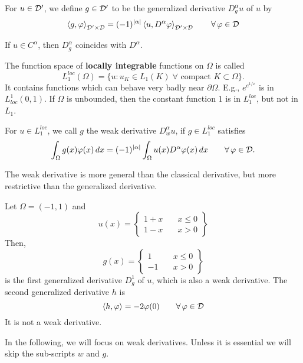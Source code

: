 \begin{definition} For $u \in {\cal D}^\prime$, we define 
$g \in {\cal D}^\prime$ to be the generalized 
derivative $D_g^\alpha u$ of $u$ by
$$
\left<g, \varphi \right>_{{\cal D}^\prime \times {\cal D}} = 
(-1)^{|\alpha|} \left<u, D^\alpha \varphi \right>_{{\cal D}^\prime \times {\cal D}}  \qquad \forall \, \varphi \in {\cal D}
$$
\end{definition}
%
\noindent
If $u \in C^\alpha$, then $D_g^\alpha$ coincides with $D^\alpha$. 

\noindent
The function space of {\bf locally integrable} functions on $\Omega$ 
is called
$$
L_1^{loc} (\Omega) = \{ u : u_K \in L_1(K) \; \forall \mbox{ compact } K 
\subset \Omega \}.
$$
It contains functions which can behave very badly near $\partial \Omega$.
E.g., $e^{e^{1/x}}$ is in $L_{loc}^1 (0,1)$. If $\Omega$ is unbounded, then
the constant function $1$ is in $L_1^{loc}$, but not in $L_1$.


\begin{definition} For $u \in L_1^{loc}$, we call $g$ the weak derivative
$D_w^\alpha u$, if $g \in L_1^{loc}$ satisfies
$$
\int_\Omega g(x) \varphi(x) \, dx =
(-1)^{|\alpha|} \int_\Omega u(x) D^\alpha \varphi (x) \, dx  \qquad \forall \, \varphi \in {\cal D}.
$$
\end{definition}
The weak derivative is more general than the classical derivative, but more
restrictive than the generalized derivative.


\begin{example} 
Let $\Omega = (-1,1)$ and 
$$
u(x) = \left\{ 
        \begin{array}{cl}
        1+x & \quad x \leq 0 \\
        1-x & \quad x > 0
        \end{array}
        \right\}
$$
Then, 
$$
g(x) = \left\{ 
        \begin{array}{cl}
        1 & \quad x \leq 0 \\
        -1 & \quad x > 0
        \end{array}
        \right\}
$$
is the first generalized derivative $D^1_g$ of $u$, which is also
a weak derivative. The second generalized derivative $h$ is 
$$
\left< h, \varphi \right> = -2 \varphi(0)  \qquad \forall \, \varphi \in {\cal D}
$$
It is not a weak derivative.
\end{example}

In the following, we will focus on weak derivatives. Unless it is essential
we will skip the sub-scripts $w$ and $g$.











